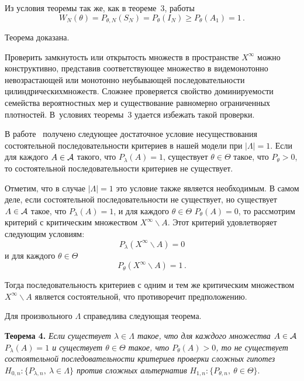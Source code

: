 \begin{multicols}{2}
    Из условия теоремы так же, как в теореме~3, работы~\cite{1gr}
    $$
    W_N(\theta ) = P_{\theta, N}(S_N) = P_\theta (I_N)\geq P_\theta \left ( A_1\right ) 
=1\,.
    $$
    
    Теорема доказана.
    \medskip
    
    Проверить замкнутость или открытость множеств в пространстве 
$X^\infty$ можно конструктивно, представив соответствующее множество в 
виде\linebreak монотонно невозрастающей или монотонно неубывающей 
последовательности цилиндрических\linebreak множеств. Сложнее проверяется свойство 
доминируемости семейства вероятностных мер и существование равномерно 
ограниченных плотностей. В~условиях теоремы~3 удается избежать такой 
проверки. 
    
    В работе~\cite{2gr} получено следующее достаточное условие 
несуществования состоятельной последовательности критериев в нашей 
модели при $\vert\Lambda\vert =1$. Если для каждого $A\in \cal{A}$  такого, 
что $P_\lambda (A)=1$, существует $\theta\in\Theta$ такое, что $P_\theta >0$, то 
состоятельной последовательности критериев не существует. 
    
    Отметим, что в случае $\vert\Lambda\vert =1$ это условие также является 
необходимым. В самом деле, если состоятельной последовательности не 
существует, но существует $A\in\cal{A}$  такое, что $P_\lambda(A)=1$, и для 
каж\-до\-го $\theta\in \Theta$ $P_\theta (A)=0$, то рассмотрим критерий с 
критическим множеством $X^\infty\backslash A$. Этот критерий удовлетворяет 
следующим условиям:
    $$
    P_\lambda (X^\infty \backslash A) =0
    $$
и для каждого $\theta \in \Theta$
$$
P_\theta (X^\infty \backslash A) =1\,.
$$
    
    Тогда последовательность критериев с одним и тем же критическим 
множеством $X^\infty \backslash A$ является состоятельной, что противоречит 
предположению. 
    
    Для произвольного $\Lambda$ справедлива следующая теорема.
    \medskip
    
    \noindent
    \textbf{Теорема 4.} \textit{Если существует $\lambda \in\Lambda$ такое, 
что для каждого множества $A\in\cal{A}$ $P_\lambda (A)=1$  и существует 
$\theta\in\Theta$ такое, что $P_\theta (A)>0$, то не существует состоятельной 
последовательности критериев проверки сложных гипотез 
$H_{0,n}:\{P_{\lambda,n},\ \lambda \in\Lambda\}$  против сложных 
альтернатив} $H_{1,n}:\{P_{\theta,n},\ \theta\in\Theta\}$.
    \smallskip
    

\end{multicols}
